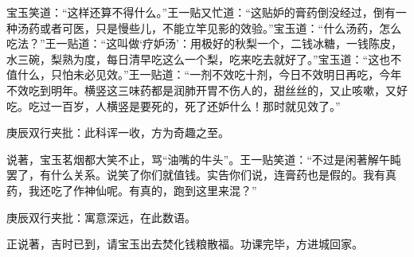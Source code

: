 \begin{parag}
宝玉笑道：“这样还算不得什么。”王一贴又忙道：“这贴妒的膏药倒没经过，倒有一种汤药或者可医，只是慢些儿，不能立竿见影的效验。”宝玉道：“什么汤药，怎么吃法？”王一贴道：“这叫做‘疗妒汤’：用极好的秋梨一个，二钱冰糖，一钱陈皮，水三碗，梨熟为度，每日清早吃这么一个梨，吃来吃去就好了。”宝玉道：“这也不值什么，只怕未必见效。”王一贴道：“一剂不效吃十剂，今日不效明日再吃，今年不效吃到明年。横竖这三味药都是润肺开胃不伤人的，甜丝丝的，又止咳嗽，又好吃。吃过一百岁，人横竖是要死的，死了还妒什么！那时就见效了。”\begin{note}庚辰双行夹批：此科诨一收，方为奇趣之至。\end{note}说著，宝玉茗烟都大笑不止，骂“油嘴的牛头”。王一贴笑道：“不过是闲著解午盹罢了，有什么关系。说笑了你们就值钱。实告你们说，连膏药也是假的。我有真药，我还吃了作神仙呢。有真的，跑到这里来混？”\begin{note}庚辰双行夹批：寓意深远，在此数语。\end{note}正说著，吉时已到，请宝玉出去焚化钱粮散福。功课完毕，方进城回家。
\end{parag}


